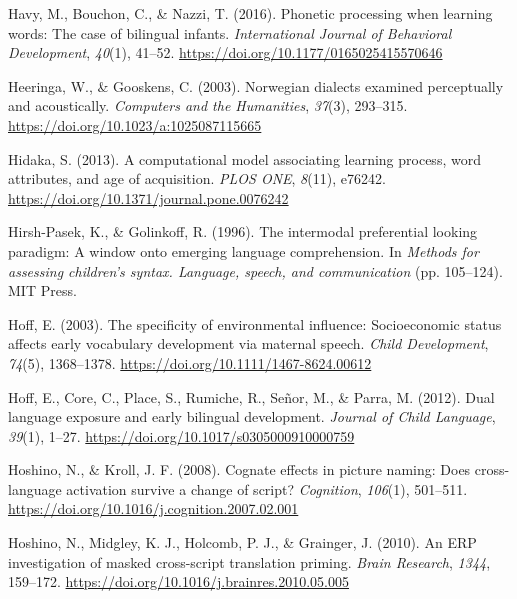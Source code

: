 \documentclass[
  12pt,
  b5paperpaper,
  twoside]{scrreprt}
\newlength{\cslhangindent}
\newlength{\cslentryspacingunit} %
\newenvironment{CSLReferences}[2] %
 {%
  \setlength{\parindent}{0pt}
  \ifodd #1
  \let\oldpar\par
  \def\par{\hangindent=\cslhangindent\oldpar}
  \fi
  \setlength{\parskip}{#2\cslentryspacingunit}
 }%
 {}
\begin{document}
\begin{CSLReferences}{1}{0}
\leavevmode{}%
Havy, M., Bouchon, C., \& Nazzi, T. (2016). Phonetic processing when
learning words: The case of bilingual infants. \emph{International
Journal of Behavioral Development}, \emph{40}(1), 41--52.
\url{https://doi.org/10.1177/0165025415570646}

\leavevmode{}%
Heeringa, W., \& Gooskens, C. (2003). Norwegian dialects examined
perceptually and acoustically. \emph{Computers and the Humanities},
\emph{37}(3), 293--315. \url{https://doi.org/10.1023/a:1025087115665}

\leavevmode{}%
Hidaka, S. (2013). A computational model associating learning process,
word attributes, and age of acquisition. \emph{PLOS ONE}, \emph{8}(11),
e76242. \url{https://doi.org/10.1371/journal.pone.0076242}

\leavevmode{}%
Hirsh-Pasek, K., \& Golinkoff, R. (1996). The intermodal preferential
looking paradigm: A window onto emerging language comprehension. In
\emph{Methods for assessing children's syntax. {Language}, speech, and
communication} (pp. 105--124). {MIT Press}.

\leavevmode{}%
Hoff, E. (2003). The specificity of environmental influence:
Socioeconomic status affects early vocabulary development via maternal
speech. \emph{Child Development}, \emph{74}(5), 1368--1378.
\url{https://doi.org/10.1111/1467-8624.00612}

\leavevmode{}%
Hoff, E., Core, C., Place, S., Rumiche, R., Señor, M., \& Parra, M.
(2012). Dual language exposure and early bilingual development.
\emph{Journal of Child Language}, \emph{39}(1), 1--27.
\url{https://doi.org/10.1017/s0305000910000759}

\leavevmode{}%
Hoshino, N., \& Kroll, J. F. (2008). Cognate effects in picture naming:
Does cross-language activation survive a change of script?
\emph{Cognition}, \emph{106}(1), 501--511.
\url{https://doi.org/10.1016/j.cognition.2007.02.001}

\leavevmode{}%
Hoshino, N., Midgley, K. J., Holcomb, P. J., \& Grainger, J. (2010). An
{ERP} investigation of masked cross-script translation priming.
\emph{Brain Research}, \emph{1344}, 159--172.
\url{https://doi.org/10.1016/j.brainres.2010.05.005}


\end{CSLReferences}
\end{document}
